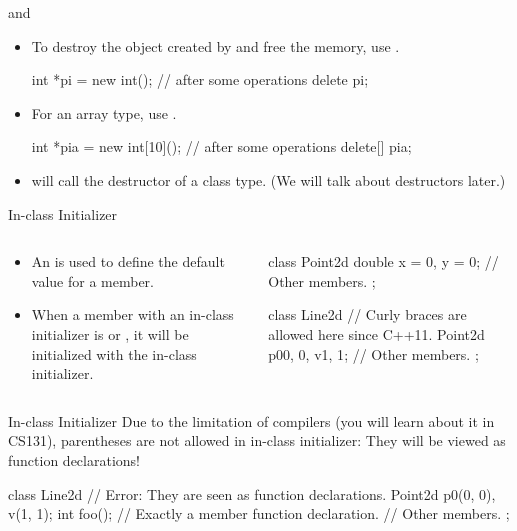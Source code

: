 \documentclass{beamer}
\begin{document}
\begin{frame}[fragile]{\new and \delete}
    \begin{itemize}
        \item To destroy the object created by \new and free the memory, use \delete.
        \begin{cpp}
int *pi = new int();
// after some operations
delete pi;
        \end{cpp}
        \item For an array type, use \ttt{[]}.
        \begin{cpp}
int *pia = new int[10]();
// after some operations
delete[] pia;
        \end{cpp}
        \item \delete will call the destructor of a class type. (We will talk about destructors later.)
    \end{itemize}
\end{frame}

\begin{frame}[fragile]{In-class Initializer}
    \begin{columns}
        \begin{column}{0.5\linewidth}
            \begin{itemize}
                \item An  is used to define the default value for a member.
                \item When a member with an in-class initializer is  or , it will be initialized with the in-class initializer.
            \end{itemize}
        \end{column}
        \begin{column}{0.5\linewidth}
            \begin{cpp}
class Point2d {
  double x = 0, y = 0;
  // Other members.
};

class Line2d {
  // Curly braces are allowed here since C++11.
  Point2d p0{0, 0}, v{1, 1};
  // Other members.
};
            \end{cpp}
        \end{column}
    \end{columns}
\end{frame}

\begin{frame}[fragile]{In-class Initializer}
    Due to the limitation of compilers (you will learn about it in CS131), parentheses are not allowed in in-class initializer: They will be viewed as function declarations!
    \begin{cpp}
class Line2d {
  // Error: They are seen as function declarations.
  Point2d p0(0, 0), v(1, 1);
  int foo(); // Exactly a member function declaration.
  // Other members.
};
    \end{cpp}
\end{frame}
\end{document}
